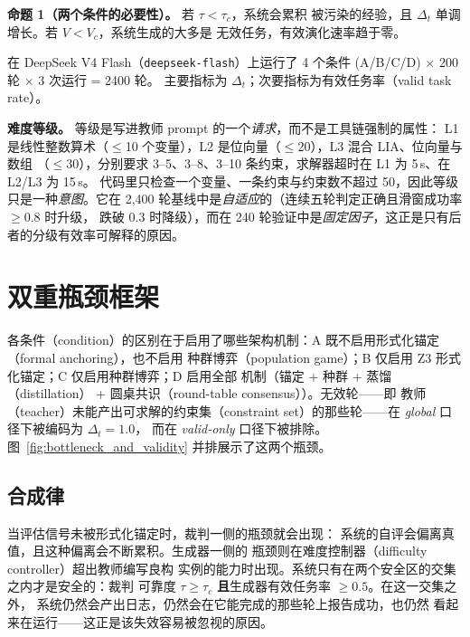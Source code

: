 \textbf{命题 1（两个条件的必要性）。} 若 $\tau < \tau_c$，系统会累积
被污染的经验，且 $\Delta_t$ 单调增长。若 $V < V_c$，系统生成的大多是
无效任务，有效演化速率趋于零。

在 DeepSeek V4 Flash（\texttt{deepseek-flash}）上运行了 4 个条件 (A/B/C/D) $\times$ 200 轮 $\times$ 3 次运行 = 2400 轮。
主要指标为 $\Delta_t$；次要指标为有效任务率（valid task rate）。

\textbf{难度等级。} 等级是写进教师 prompt 的一个\emph{请求}，而不是工具链强制的属性：
L1 是线性整数算术（$\le$10 个变量），L2 是位向量（$\le$20），L3 混合 LIA、位向量与数组
（$\le$30），分别要求 3--5、3--8、3--10 条约束，求解器超时在 L1 为 5\,s、在 L2/L3 为 15\,s。
代码里只检查一个变量、一条约束与约束数不超过 50，因此等级只是一种\emph{意图}。它在
2{,}400 轮基线中是\emph{自适应}的（连续五轮判定正确且滑窗成功率 $\ge 0.8$ 时升级，
跌破 $0.3$ 时降级），而在 240 轮验证中是\emph{固定因子}，这正是只有后者的分级有效率可解释的原因。

\section{双重瓶颈框架}

各条件（condition）的区别在于启用了哪些架构机制：A 既不启用形式化锚定（formal anchoring），也不启用
种群博弈（population game）；B 仅启用 Z3 形式化锚定；C 仅启用种群博弈；D 启用全部
机制（锚定 + 种群 + 蒸馏（distillation） + 圆桌共识（round-table consensus））。无效轮——即
教师（teacher）未能产出可求解的约束集（constraint set）的那些轮——在 \textit{global} 口径下被编码为 $\Delta_t = 1.0$，
而在 \textit{valid-only} 口径下被排除。
图~\ref{fig:bottleneck_and_validity} 并排展示了这两个瓶颈。

\subsection{合成律}

当评估信号未被形式化锚定时，裁判一侧的瓶颈就会出现：
系统的自评会偏离真值，且这种偏离会不断累积。生成器一侧的
瓶颈则在难度控制器（difficulty controller）超出教师编写良构
实例的能力时出现。系统只有在两个安全区的交集之内才是安全的：裁判
可靠度 $\tau \ge \tau_c$ \textbf{且}生成器有效任务率 $\ge 0.5$。在这一交集之外，
系统仍然会产出日志，仍然会在它能完成的那些轮上报告成功，也仍然
看起来在运行——这正是该失效容易被忽视的原因。

